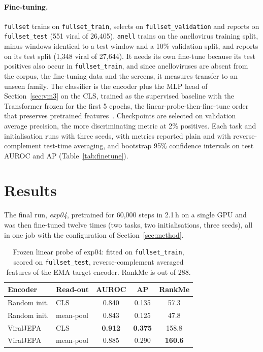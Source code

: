 \documentclass[10pt,twocolumn,a4paper]{article}
\begin{document}
\paragraph{Fine-tuning.}
\texttt{fullset} trains on \texttt{fullset\_train}, selects on
\texttt{fullset\_validation} and reports on \texttt{fullset\_test} (551 viral of
26{,}405). \texttt{anell} trains on the anellovirus training split, minus windows
identical to a test window and a 10\% validation split, and reports on its test
split (1{,}348 viral of 27{,}644). It needs its own fine-tune because its test
positives also occur in \texttt{fullset\_train}, and since anelloviruses are
absent from the corpus, the fine-tuning data and the screens, it measures
transfer to an unseen family. The classifier is the encoder plus the MLP head of
Section~\ref{sec:vm3} on the CLS, trained as the supervised baseline with the
Transformer frozen for the first 5 epochs, the linear-probe-then-fine-tune order
that preserves pretrained features~\cite{kumar2022lpft}. Checkpoints are selected
on validation average precision, the more discriminating metric at 2\% positives.
Each task and initialisation runs with three seeds, with metrics reported plain
and with reverse-complement test-time averaging, and bootstrap 95\% confidence
intervals on test AUROC and AP (Table~\ref{tab:finetune}).

\section{Results}\label{sec:results}

The final run, \emph{exp04}, pretrained for 60{,}000 steps in 2.1\,h on a single
GPU and was then fine-tuned twelve times (two tasks, two initialisations,
three seeds), all in one job with the configuration of Section~\ref{sec:method}.

\begin{table}[t]
\centering
\caption{Frozen linear probe of exp04: fitted on \texttt{fullset\_train}, scored
on \texttt{fullset\_test}, reverse-complement averaged features of the EMA target
encoder. RankMe is out of 288.}
\label{tab:probe}
\footnotesize
\setlength{\tabcolsep}{4pt}
\begin{tabular}{llccc}
\toprule
Encoder & Read-out & AUROC & AP & RankMe \\
\midrule
Random init. & CLS       & 0.840 & 0.135 & 57.3 \\
Random init. & mean-pool & 0.843 & 0.125 & 47.8 \\
ViralJEPA    & CLS       & \textbf{0.912} & \textbf{0.375} & 158.8 \\
ViralJEPA    & mean-pool & 0.885 & 0.290 & \textbf{160.6} \\
\bottomrule
\end{tabular}
\end{table}
\end{document}

